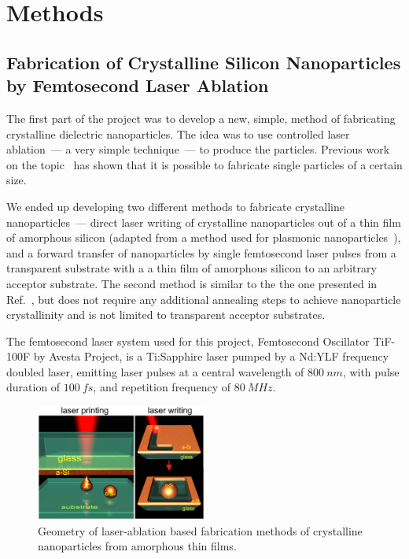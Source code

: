 \section{Methods}
\label{ch:Exp}

    \subsection{Fabrication of Crystalline Silicon Nanoparticles by Femtosecond Laser Ablation}
    \label{sec:Ablation}
            The first part of the project was to develop a new, simple, method of fabricating crystalline dielectric
        nanoparticles. The idea was to use controlled laser ablation~--- a very simple technique~--- to produce the particles.
        Previous work on the topic~\cite{kuznetsov2012magnetic, zywietz2014laser} has shown that it is possible to fabricate single particles
        of a certain size.

            We ended up developing two different methods to fabricate crystalline nanoparticles~--- direct laser writing of crystalline
        nanoparticles out of a thin film of amorphous silicon (adapted from a method used for plasmonic nanoparticles~\cite{makarov2016controllable,dmitriev2016direct}), and a forward transfer of nanoparticles by single femtosecond laser pulses
        from a transparent substrate with a a thin film of amorphous silicon to an arbitrary acceptor substrate. The second method is
        similar to the the one presented in Ref.~\cite{zywietz2014laser}, but does not require any additional annealing steps to achieve
        nanoparticle crystallinity and is not limited to transparent acceptor substrates.

            The femtosecond laser system used for this project, Femtosecond Oscillator TiF-100F by Avesta Project, is a Ti:Sapphire laser pumped
        by a Nd:YLF frequency doubled laser, emitting laser pulses at a central wavelength of $800~\si{nm}$, with pulse duration of $100~\si{fs}$,
        and repetition frequency of $80~\si{MHz}$.

        \begin{figure}[h!]
                \begin{center}
                    \includegraphics[width=0.5\textwidth]{figs/methods/LaserPrinting.eps}
                \end{center}
                \caption{Geometry of laser-ablation based fabrication methods of crystalline nanoparticles from amorphous
                            thin films.}
                \label{fig:LaserPrinting}
        \end{figure}

